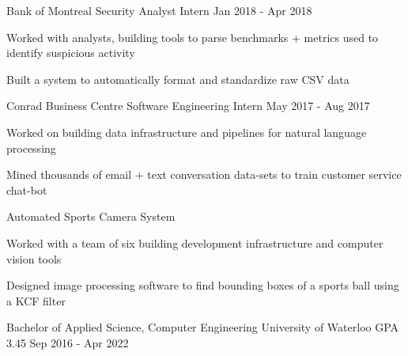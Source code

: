 \documentclass[11pt, a4paper]{awesome-cv}
\begin{document}
\begin{siderules1}
\begin{cventries}
{\begin{cvitems}
      \end{cvitems}
    }
  \cventry
    {\textit{}}
    {Bank of Montreal}
    {Security Analyst Intern}
    {Jan 2018 - Apr 2018}
    {
      \begin{cvitems}
        \item {Worked with analysts, building tools to parse benchmarks + metrics used to identify suspicious activity}
        \item {Built a system to automatically format and standardize raw CSV data}
      \end{cvitems}
    }
  \cventry
    {\textit{}}
    {Conrad Business Centre}
    {Software Engineering Intern}
    {May 2017 - Aug 2017}
    {
      \begin{cvitems}
        \item {Worked on building data infrastructure and pipelines for natural language processing}
        \item {Mined thousands of email + text conversation data-sets to train customer service chat-bot}
      \end{cvitems}
    }
\end{cventries}
\end{siderules1}

\begin{siderules2}
\begin{cventries}
    \cventry
        {\textit{}}
        {Automated Sports Camera System}
        {}
        {}
        {
          \begin{cvitems}
            \item {Worked with a team of six building development infrastructure and computer vision tools}
            \item {Designed image processing software to find bounding boxes of a sports ball using a KCF filter}
          \end{cvitems}
        }
\end{cventries}
\end{siderules2}
\begin{siderules3}
\begin{cventries}
    \education
    {\fontsize{11pt}{1.3em}\bodyfont\upshape\color{text}\selectfont Bachelor of Applied Science, Computer Engineering}
    {University of Waterloo}
    {GPA 3.45}
    {Sep 2016 - Apr 2022}
    {
      \begin{cvitems}
      \end{cvitems}
    }
\end{cventries}
\end{siderules3}
\end{document}
